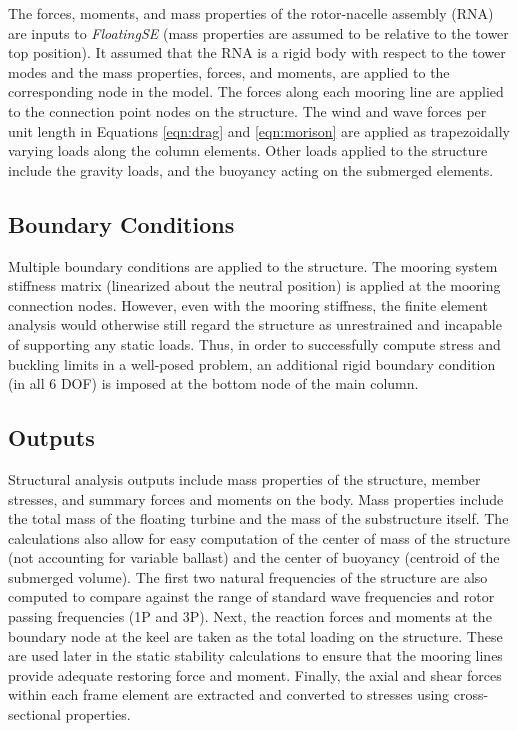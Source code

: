 The forces, moments, and mass properties of the rotor-nacelle assembly
(RNA) are inputs to \textit{FloatingSE} (mass properties are assumed to
be relative to the tower top position).  It assumed that the RNA is a
rigid body with respect to the tower modes and the mass properties,
forces, and moments, are applied to the corresponding node in the model.
The forces along each mooring line are applied to the connection
point nodes on the structure.  The wind and wave forces per unit length
in Equations \ref{eqn:drag} and \ref{eqn:morison} are applied as
trapezoidally varying loads along the column elements.  Other loads
applied to the structure include the gravity loads, and the buoyancy
acting on the submerged elements.

\subsection{Boundary Conditions}
Multiple boundary conditions are applied to the structure.  The mooring
system stiffness matrix (linearized about the neutral position) is
applied at the mooring connection nodes.  However, even with the mooring
stiffness, the finite element analysis would otherwise still regard the
structure as unrestrained and incapable of supporting any static loads.
Thus, in order to successfully compute stress and buckling limits in a
well-posed problem, an additional rigid boundary condition (in all 6
DOF) is imposed at the bottom node of the main column.

\subsection{Outputs}
Structural analysis outputs include mass properties of the structure,
member stresses, and summary forces and moments on the body.  Mass
properties include the total mass of the floating turbine and the mass
of the substructure itself.  The calculations also allow for easy
computation of the center of mass of the structure (not accounting for
variable ballast) and the center of buoyancy (centroid of the submerged
volume).  The first two natural frequencies of the structure are also
computed to compare against the range of standard wave frequencies and
rotor passing frequencies (1P and 3P).  Next, the reaction forces and
moments at the boundary node at the keel are taken as the total loading
on the structure.  These are used later in the static stability
calculations to ensure that the mooring lines provide adequate restoring
force and moment.  Finally, the axial and shear forces within each frame
element are extracted and converted to stresses using cross-sectional
properties.

